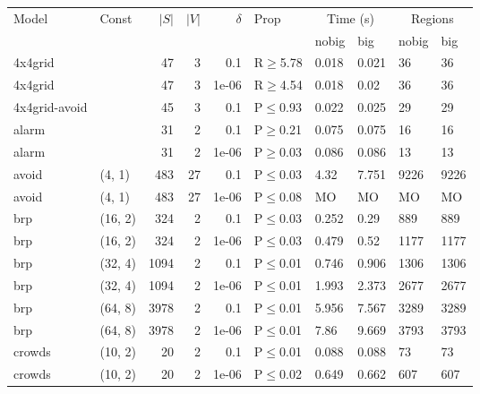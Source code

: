 \begin{longtable}{llrrrlllll}

        \toprule
        Model & Const & $|S|$ & $|V|$ & $\delta$ & Prop & \multicolumn{2}{c}{Time (s)} & \multicolumn{2}{c}{Regions} \\
        \cmidrule(ll){7-8} \cmidrule(ll){9-10}
        & & & & & & nobig & big & nobig & big \\
        \midrule
        
 4x4grid       &           &     	47 &   3 & 0.1   & R$\geq$5.78  & 0.018  & 0.021   & 36      & 36      \\
 4x4grid       &           &     	47 &   3 & 1e-06 & R$\geq$4.54  & 0.018  & 0.02    & 36      & 36      \\
 4x4grid-avoid &           &     	45 &   3 & 0.1   & P$\leq$0.93  & 0.022  & 0.025   & 29      & 29      \\
 alarm         &           &     	31 &   2 & 0.1   & P$\geq$0.21  & 0.075  & 0.075   & 16      & 16      \\
 alarm         &           &     	31 &   2 & 1e-06 & P$\geq$0.03  & 0.086  & 0.086   & 13      & 13      \\
 avoid         & (4, 1)    &    	483 &  27 & 0.1   & P$\leq$0.03  & 4.32   & 7.751   & 9226    & 9226    \\
 avoid         & (4, 1)    &    	483 &  27 & 1e-06 & P$\leq$0.08  & MO     & MO      & MO      & MO      \\
 brp           & (16, 2)   &    	324 &   2 & 0.1   & P$\leq$0.03  & 0.252  & 0.29    & 889     & 889     \\
 brp           & (16, 2)   &    	324 &   2 & 1e-06 & P$\leq$0.03  & 0.479  & 0.52    & 1177    & 1177    \\
 brp           & (32, 4)   &   	1094 &   2 & 0.1   & P$\leq$0.01  & 0.746  & 0.906   & 1306    & 1306    \\
 brp           & (32, 4)   &   	1094 &   2 & 1e-06 & P$\leq$0.01  & 1.993  & 2.373   & 2677    & 2677    \\
 brp           & (64, 8)   &   	3978 &   2 & 0.1   & P$\leq$0.01  & 5.956  & 7.567   & 3289    & 3289    \\
 brp           & (64, 8)   &   	3978 &   2 & 1e-06 & P$\leq$0.01  & 7.86   & 9.669   & 3793    & 3793    \\
 crowds        & (10, 2)   &     	20 &   2 & 0.1   & P$\leq$0.01  & 0.088  & 0.088   & 73      & 73      \\
 crowds        & (10, 2)   &     	20 &   2 & 1e-06 & P$\leq$0.02  & 0.649  & 0.662   & 607     & 607     \\

\end{longtable}
